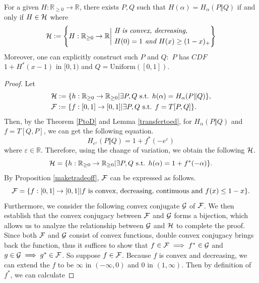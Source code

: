 \documentclass{article}
\begin{document}
\begin{lemma}\label{makedomi}
    For a given $H: \mathbb{R}_{\ge0} \to \mathbb{R}$, there exists $P,Q$ such that $H(\alpha) = H_\alpha(P\Vert Q)$ if and only if $H \in {\mathcal{H}}$ where 
    \begin{equation*}
        {\mathcal{H}} := \left\{H: \mathbb{R}_{\ge 0} \to \mathbb{R} \bigg|\ \begin{aligned}
            &\textit{H is convex, decreasing,}\\
            &H(0) = 1 \textit{ and } H(x)\ge(1-x)_+
        \end{aligned}  \right\}
    \end{equation*}
Moreover, one can explicitly construct such $P$ and $Q:$ $P$ has $CDF$ $1+H^*(x-1)$ in $[0,1)$ and $Q =\text{Uniform}([0,1])$.

\begin{proof}
    Let 
    \begin{align*}
    &{\mathcal{H}} := \{h: \mathbb{R}_{\ge 0} \to \mathbb{R}_{\ge 0} | \exists P,Q\text{ s.t. }h(\alpha) = H_\alpha(P\Vert Q)\},\\    
    &{\mathcal{F}} := \{f:[0,1] \to [0,1] | \exists P,Q \text{ s.t. }f = T[P,Q]\}.
    \end{align*}
    Then, by the Theorem \ref{PtoD} and Lemma \ref{transfertoed}, for $H_\alpha(P\Vert Q)$ and $f= T[Q,P]$, we can get the following equation.
    \begin{equation*}
        H_{e^\varepsilon}(P \Vert Q) = 1+ f^*(-e^\varepsilon)
    \end{equation*}
    where $\varepsilon \in \mathbb{R}$. Therefore, using the change of variation, we obtain the following ${\mathcal{H}}$.
\begin{equation*}
{\mathcal{H}} = \{h: \mathbb{R}_{\ge 0} \to \mathbb{R}_{\ge 0} | \exists P,Q\text{ s.t. }h(\alpha) = 1 + f^*(-\alpha)\}.
\end{equation*}
By Proposition \ref{maketradeoff}, ${\mathcal{F}}$ can be expressed as follows.
\begin{equation*}
    {\mathcal{F}} = \{f : [0,1] \to [0,1]| f\text{ is convex, decreasing, continuous and }f(x) \le 1-x \}.
\end{equation*}
Furthermore, we consider the following convex conjugate ${\mathcal{G}}$ of ${\mathcal{F}}$. We then establish that the convex conjugacy between ${\mathcal{F}}$ and ${\mathcal{G}}$ forms a bijection, which allows us to analyze the relationship between ${\mathcal{G}}$ and ${\mathcal{H}}$ to complete the proof.
Since both ${\mathcal{F}}$ and ${\mathcal{G}}$ consist of convex functions, double convex conjugacy brings back the function, thus it suffices to show that $f \in {\mathcal{F}} \implies f^* \in {\mathcal{G}}$ and $g \in {\mathcal{G}} \implies g^* \in {\mathcal{F}}$. So suppose $f \in {\mathcal{F}}$. Because $f$ is convex and decreasing, we can extend the $f$ to be $\infty$ in $(-\infty, 0)$ and $0$ in $(1, \infty)$. Then by definition of $f^*$, we can calculate 

\end{proof}
\end{lemma}
\end{document}
